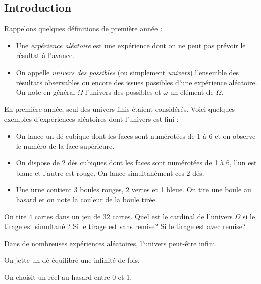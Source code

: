 \documentclass[a4paper,10pt]{report}
\begin{document}
\subsection{Introduction}
\noindent Rappelons quelques définitions de première année :
\begin{itemize}
 \item Une \textit{expérience aléatoire} est une expérience dont on ne peut pas prévoir le résultat à l'avance. 
 \item On appelle \textit{univers des possibles} (ou simplement \textit{univers}) l'ensemble des résultats observables ou encore des issues possibles d'une expérience aléatoire. On note en général $\Omega$ l'univers des possibles et $\omega$ un élément de $\Omega$.
\end{itemize}
En première année, seul des univers finis étaient considérés. Voici quelques exemples d'expériences aléatoires dont l'univers est fini :

\begin{itemize}
\item On lance un dé cubique dont les faces sont numérotées de 1 à 6 et on observe le numéro de la face supérieure.
\item On dispose de 2 dés cubiques dont les faces sont numérotées de 1 à 6,  l'un est blanc et l'autre est rouge. On lance simultanément ces 2 dés. 
\item Une urne contient 3 boules rouges, 2 vertes et 1 bleue. On tire une boule au hasard et on note la couleur de la boule tirée.
\end{itemize}

\begin{ex}
On tire $4$ cartes dans un jeu de $32$ cartes. Quel est le cardinal de l'univers $\Omega$ si le tirage est simultané ? Si le tirage est sans remise? Si le tirage est avec remise?

\vspace{3cm}

\end{ex}

\medskip

\noindent Dans de nombreuses expériences aléatoires, l'univers peut-être infini.

\vspace{0.2cm}

\begin{exems}
\item On jette un dé équilibré une infinité de fois.
\item On choisit un réel au hasard entre 0 et 1.
\end{exems}
\end{document}
